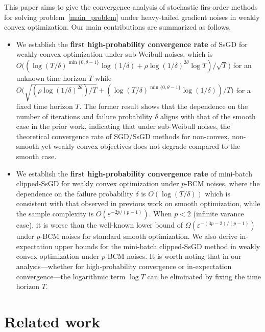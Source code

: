 \documentclass{article}
\begin{document}
This paper aims to give the convergence analysis of stochastic firs-order methods for solving problem~\eqref{main_problem} under heavy-tailed gradient noises in weakly convex optimization. Our main contributions are summarized as follows. 
\begin{itemize}
    \item We establish the \textbf{first high-probability convergence rate} of SsGD for weakly convex optimization under sub-Weibull noises, which is $  O\big( (\log(T/\delta)^{\min\{0,\theta-1\}} \log(1/\delta)+ \rho \log(1/\delta)^{2\theta} \log T)/\sqrt{T}\big)$ for an unknown time horizon $T$ while $O\big( \sqrt{\left(\rho \log(1/\delta)^{2\theta}\right)/T} + \left(\log(T/\delta)^{\min\{0,\theta-1\}} \log(1/\delta)\right)/T \big)$ for a fixed time horizon $T$. The former result shows that the dependence on the number of iterations and failure probability \( \delta \) aligns with that of the smooth case in the prior work, indicating that under sub-Weibull noises, the theoretical convergence rate of SGD/SsGD methods for non-convex, non-smooth yet weakly convex objectives does not degrade compared to the smooth case.
    
   \item  We establish the \textbf{first high-probability convergence rate} of mini-batch clipped-SsGD for weakly convex optimization under $p$-BCM noises, where the dependence on the failure probability $\delta$ is $O(\log(T/\delta))$ which is consistent with that observed in previous work on smooth optimization, while the sample complexity is $\widetilde{O}(\varepsilon^{-2p/(p-1)})$. When $p<2$ (infinite varance case), it is worse than the well-known lower bound of $\Omega(\varepsilon^{-(3p-2)/(p-1)})$ under $p$-BCM noises for standard smooth optimization.  We also derive in-expectation upper bounds for the mini-batch clipped-SsGD method in weakly convex optimization under $p$-BCM noises. It is worth noting that in our analysis—whether for high-probability convergence or in-expectation convergence—the logarithmic term $\log T$ can be eliminated by fixing the time horizon $T$.
\end{itemize}


\section{Related work}
\end{document}
